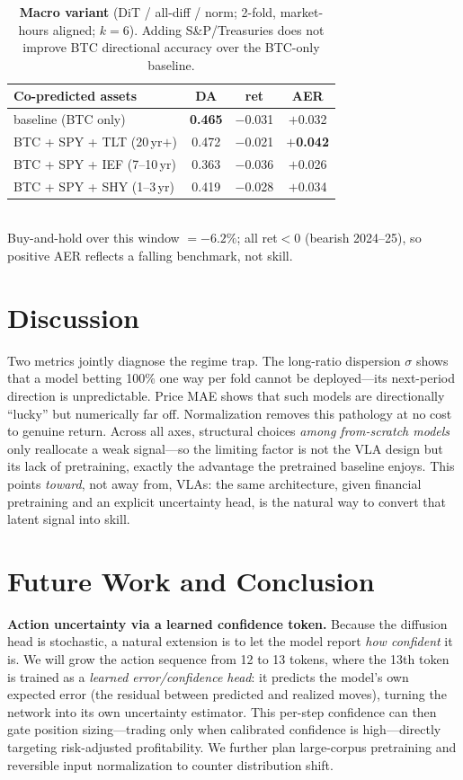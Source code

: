 \documentclass[10pt]{article}
\begin{document}
\begin{table}[htbp]
\centering\small
\caption{\textbf{Macro variant} (DiT / all-diff / norm; 2-fold, market-hours aligned; $k{=}6$).
Adding S\&P/Treasuries does not improve BTC directional accuracy over the BTC-only baseline.}
\label{tab:macro}
\begin{tabular}{lccc}
\toprule
Co-predicted assets & DA & ret & AER \\ \midrule
baseline (BTC only)          & \textbf{0.465} & $-$0.031 & $+$0.032 \\
BTC + SPY + TLT (20\,yr$+$)  & 0.472 & $-$0.021 & \textbf{$+$0.042} \\
BTC + SPY + IEF (7--10\,yr)  & 0.363 & $-$0.036 & $+$0.026 \\
BTC + SPY + SHY (1--3\,yr)   & 0.419 & $-$0.028 & $+$0.034 \\
\bottomrule
\end{tabular}\\[2pt]
{\footnotesize Buy-and-hold over this window ${=}-6.2\%$; all ret${<}0$ (bearish 2024--25), so
positive AER reflects a falling benchmark, not skill.}
\end{table}

\section{Discussion}
Two metrics jointly diagnose the regime trap. The long-ratio dispersion $\sigma$ shows that a
model betting 100\% one way per fold cannot be deployed---its next-period direction is
unpredictable. Price MAE shows that such models are directionally ``lucky'' but numerically far
off. Normalization removes this pathology at no cost to genuine return. Across all axes, structural
choices \emph{among from-scratch models} only reallocate a weak signal---so the limiting factor is
not the VLA design but its lack of pretraining, exactly the advantage the pretrained baseline
enjoys. This points \emph{toward}, not away from, VLAs: the same architecture, given financial
pretraining and an explicit uncertainty head, is the natural way to convert that latent signal
into skill.

\section{Future Work and Conclusion}
\textbf{Action uncertainty via a learned confidence token.} Because the diffusion head is
stochastic, a natural extension is to let the model report \emph{how confident} it is. We will
grow the action sequence from 12 to 13 tokens, where the 13th token is trained as a \emph{learned
error/confidence head}: it predicts the model's own expected error (the residual between
predicted and realized moves), turning the network into its own uncertainty estimator. This
per-step confidence can then gate position sizing---trading only when calibrated confidence is
high---directly targeting risk-adjusted profitability. We further plan large-corpus pretraining
and reversible input normalization to counter distribution shift.
\end{document}
